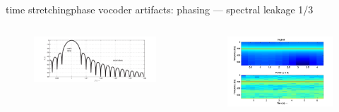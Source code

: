     \begin{frame}{time stretching}{phase vocoder artifacts: phasing --- spectral leakage 1/3}
        \vspace{-5mm}
        \begin{columns}
            \begin{figure}
                \centering
                \includegraphics[scale=.3]{graph/SpectralLeakage}
            \end{figure}
            \begin{figure}
                \centerline{\includegraphics[scale=.5]{graph/PeakSmearingFreq}}
            \end{figure}
        \end{columns}
    \end{frame}
